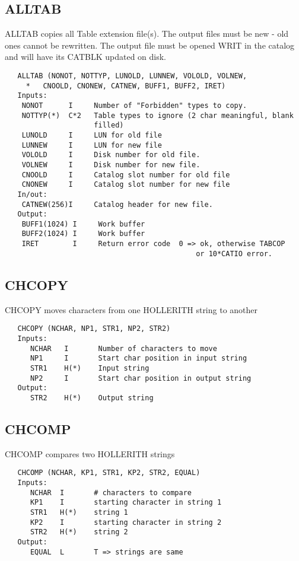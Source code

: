 \subsection{ALLTAB}
ALLTAB copies all Table extension file(s).  The output files must
be new - old ones cannot be rewritten.  The output file
must be opened WRIT in the catalog and will have its CATBLK
updated on disk.
\begin{verbatim}
   ALLTAB (NONOT, NOTTYP, LUNOLD, LUNNEW, VOLOLD, VOLNEW,
     *   CNOOLD, CNONEW, CATNEW, BUFF1, BUFF2, IRET)
   Inputs:
    NONOT      I     Number of "Forbidden" types to copy.
    NOTTYP(*)  C*2   Table types to ignore (2 char meaningful, blank
                     filled)
    LUNOLD     I     LUN for old file
    LUNNEW     I     LUN for new file
    VOLOLD     I     Disk number for old file.
    VOLNEW     I     Disk number for new file.
    CNOOLD     I     Catalog slot number for old file
    CNONEW     I     Catalog slot number for new file
   In/out:
    CATNEW(256)I     Catalog header for new file.
   Output:
    BUFF1(1024) I     Work buffer
    BUFF2(1024) I     Work buffer
    IRET        I     Return error code  0 => ok, otherwise TABCOP
                                             or 10*CATIO error.
\end{verbatim}
\subsection{CHCOPY}
CHCOPY  moves characters from one HOLLERITH string to another
\begin{verbatim}
   CHCOPY (NCHAR, NP1, STR1, NP2, STR2)
   Inputs:
      NCHAR   I       Number of characters to move
      NP1     I       Start char position in input string
      STR1    H(*)    Input string
      NP2     I       Start char position in output string
   Output:
      STR2    H(*)    Output string
\end{verbatim}

\subsection{CHCOMP}
CHCOMP compares two HOLLERITH strings
\begin{verbatim}
   CHCOMP (NCHAR, KP1, STR1, KP2, STR2, EQUAL)
   Inputs:
      NCHAR  I       # characters to compare
      KP1    I       starting character in string 1
      STR1   H(*)    string 1
      KP2    I       starting character in string 2
      STR2   H(*)    string 2
   Output:
      EQUAL  L       T => strings are same
\end{verbatim}

